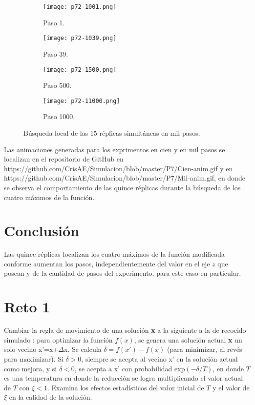 \documentclass{article}
\begin{document}
\begin{figure}
\centering
\begin{subfigure}[b]{0.4\linewidth}
\texttt{[image: p72-1001.png]}
\caption{Paso 1.}
\label{f1}
\end{subfigure}
\begin{subfigure}[b]{0.4\linewidth}
\texttt{[image: p72-1039.png]}
\caption{Paso 39.}
\label{f1d}
\end{subfigure}
\begin{subfigure}[b]{0.4\linewidth}
\texttt{[image: p72-1500.png]}
\caption{Paso 500.}
\label{f2d}
\end{subfigure}
\begin{subfigure}[b]{0.4\linewidth}
\texttt{[image: p72-11000.png]}
\caption{Paso 1000.}
\label{f2d}
\end{subfigure}
\caption{Búsqueda local de las 15 réplicas simultáneas en mil pasos.}
\label{mil}
\end{figure}

Las animaciones generadas para los exprimentos en cien y en mil pasos se localizan en el repositorio de GitHub en https://github.com/CrisAE/Simulacion/blob/master/P7/Cien-anim.gif y en https://github.com/CrisAE/Simulacion/blob/master/P7/Mil-anim.gif, en donde se observa el comportamiento de las quince réplicas durante la búsqueda de los cuatro máximos de la función.

\section{Conclusión}
Las quince réplicas localizan los cuatro máximos de la función modificada conforme aumentan los pasos, independientemente del valor en el eje $z$ que posean y de la cantidad de pasos del experimento, para este caso en particular.

\section{Reto 1}
Cambiar la regla de movimiento de una solución \textbf{x} a la siguiente a la de recocido simulado \cite{dra}: para optimizar la función $f(x)$, se genera una solución actual \textbf{x} un solo vecino x'=x+$\Delta$x. Se calcula $\delta=f(x')-f(x)$ (para minimizar, al revés para maximizar). Si $\delta>0$, siempre se acepta al vecino x' en la solución actual como mejora, y si $\delta<0$, se acepta a x' con probabilidad exp$(-\delta/T)$, en donde $T$ es una temperatura en donde la reducción se logra multiplicando el valor actual de $T$ con $\xi<1$. Examina los efectos estadísticos del valor inicial de $T$ y el valor de $\xi$ en la calidad de la solución.
\end{document}
